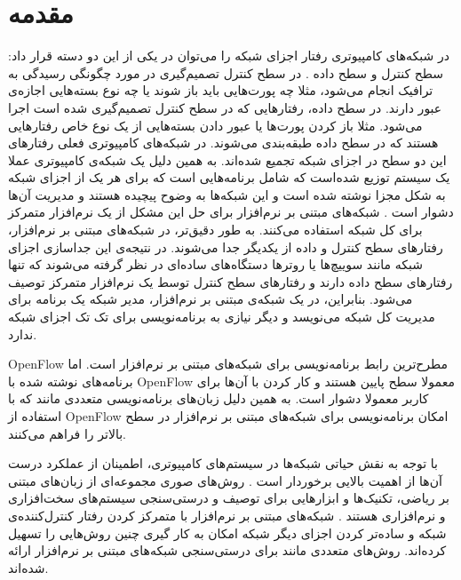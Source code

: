 \chapter{مقدمه}
در شبکه‌های کامپیوتری رفتار اجزای شبکه‌ را می‌توان در یکی از این دو دسته قرار داد:
سطح کنترل
 و سطح داده
.
در سطح کنترل تصمیم‌گیری در مورد چگونگی رسیدگی به ترافیک انجام می‌شود، مثلا چه پورت‌هایی باید باز شوند یا چه نوع بسته‌هایی اجازه‌ی عبور دارند.
در سطح داده، رفتار‌هایی که در سطح کنترل تصمیم‌گیری شده است اجرا می‌شود. 
مثلا باز کردن پورت‌ها یا عبور دادن بسته‌هایی از یک نوع خاص 
رفتار‌هایی هستند که در سطح داده طبقه‌‌بندی می‌شوند.
در شبکه‌های کامپیوتری فعلی رفتار‌های این دو سطح در اجزای شبکه تجمیع شده‌اند.
به همین دلیل یک شبکه‌ی کامپیوتری عملا یک سیستم توزیع شده‌است که شامل برنامه‌هایی است که برای هر یک از اجزای شبکه به شکل مجزا نوشته شده است و این شبکه‌ها به وضوح پیچیده هستند و مدیریت آن‌ها دشوار است
\cite{sdn-survey}.
شبکه‌های مبتنی بر نرم‌افزار
برای حل این مشکل از یک نرم‌افزار متمرکز برای کل‌ شبکه استفاده می‌کنند.
به طور دقیق‌تر، در شبکه‌های مبتنی بر نرم‌افزار، رفتار‌های سطح کنترل و داده از یکدیگر جدا می‌شوند. 
در نتیجه‌ی این جداسازی اجزای شبکه مانند سوییچ‌ها یا روترها دستگاه‌های ساده‌ای در نظر گرفته می‌شوند که تنها رفتار‌های سطح داده دارند و رفتار‌های سطح کنترل توسط یک نرم‌افزار متمرکز توصیف می‌شود.
بنابراین، در یک شبکه‌ی مبتنی بر نرم‌افزار، مدیر شبکه یک برنامه برای مدیریت کل شبکه می‌نویسد و دیگر نیازی به برنامه‌نویسی برای تک تک اجزای شبکه ندارد.

OpenFlow
\cite{mckeown2008openflow}
مطرح‌ترین رابط برنامه‌نویسی
برای شبکه‌های مبتنی بر نرم‌افزار است.
اما برنامه‌های نوشته شده با 
OpenFlow
معمولا سطح پایین هستند و کار کردن با آن‌ها برای کاربر معمولا دشوار است. 
به همین دلیل زبان‌های برنامه‌نویسی متعددی مانند
\cite{foster2011frenetic,voellmy2011nettle,netcore,procera,pyretic,netkat}
که با استفاده از 
OpenFlow
امکان برنامه‌نویسی برای شبکه‌های مبتنی بر نرم‌افزار در سطح بالاتر را فراهم می‌کنند.

با توجه به نقش حیاتی شبکه‌ها در سیستم‌های کامپیوتری، اطمینان از عملکرد درست آن‌ها از اهمیت بالایی برخوردار است 
\cite{foerster2018survey}.
روش‌های صوری
مجموعه‌ای از زبان‌های مبتنی بر ریاضی، تکنیک‌ها و ابزار‌هایی برای توصیف و درستی‌سنجی سیستم‌های سخت‌افزاری و نرم‌افزاری هستند
\cite{clarke1996formal}.
شبکه‌های مبتنی بر نرم‌افزار با متمرکز کردن رفتار کنترل‌کننده‌ی شبکه و ساده‌تر کردن اجزای دیگر شبکه امکان به کار گیری چنین روش‌هایی را تسهیل کرده‌اند.
روش‌های متعددی مانند
\cite{al2010flowchecker,khurshid2013veriflow,not-nice,zeng2014libra}
برای درستی‌سنجی شبکه‌های مبتنی بر نرم‌افزار ارائه شده‌اند.

